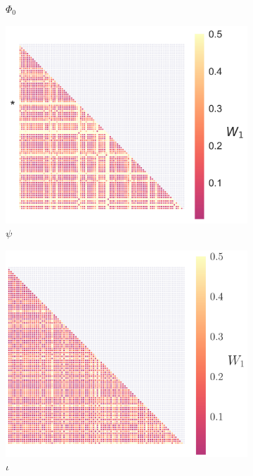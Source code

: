 \documentclass[fleqn,usenatbib,useAMS]{mnras}
\begin{document}
\begin{figure}
\begin{subfigure}[b]{0.22\textwidth}
		\caption{$\Phi_0$}
	\end{subfigure}
	\hfill	
	\begin{subfigure}[b]{0.22\textwidth}
		\includegraphics[width=\textwidth]{images/WD_2}
		\caption{$\psi$} \label{figWD_psi}
	\end{subfigure}
	\hfill
	\begin{subfigure}[b]{0.22\textwidth}
		\includegraphics[width=\textwidth]{images/WD_3}
		\caption{$\iota$}
	\end{subfigure}
	\medskip
	\begin{subfigure}[b]{0.3\textwidth}

\end{subfigure}
\end{figure}
\end{document}
